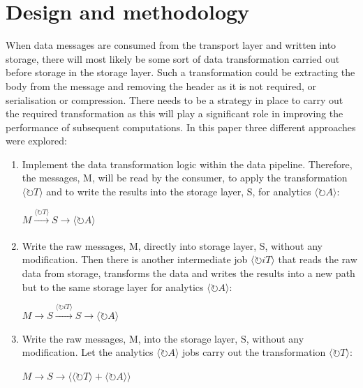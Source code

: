 \section{Design and methodology} \label{lbl-dm}
When data messages are consumed from the transport layer and written into storage, there will most likely be some sort of data transformation carried out before storage in the storage layer. Such a transformation could be extracting the body from the message and removing the header as it is not required, or serialisation or compression. There needs to be a strategy in place to carry out the required transformation as this will play a significant role in improving the performance of subsequent computations. In this paper three different approaches were explored:

\begin{enumerate}
	\item Implement the data transformation logic within the data pipeline. Therefore, the messages, M, will be read by the consumer, to apply the transformation \(\langle\circlearrowright T\rangle \) and to write the results into the storage layer, S, for analytics \( \langle\circlearrowright A\rangle \):
	
		\centerline{\(M \xrightarrow[]{\langle\circlearrowright T\rangle}S\rightarrow  \langle\circlearrowright A\rangle \)}
		
	\item Write the raw messages, M, directly into storage layer, S, without any modification. Then there is another intermediate job \(\langle\circlearrowright iT\rangle\) that reads the raw data from storage, transforms the data and writes the results into a new path but to the same storage layer for analytics \( \langle\circlearrowright A\rangle \):
	
	\centerline{\(M\rightarrow S\xrightarrow {\langle\circlearrowright iT\rangle} S\rightarrow   \langle\circlearrowright A\rangle \)}
	
	\item Write the raw messages, M, into the storage layer, S, without any modification. Let the analytics \( \langle\circlearrowright A\rangle \) jobs carry out the transformation \(\langle\circlearrowright T\rangle \):
	
	\centerline{\(M \rightarrow S\rightarrow   \langle \langle\circlearrowright T\rangle +\langle\circlearrowright A\rangle \rangle \)}
	
\end{enumerate}

